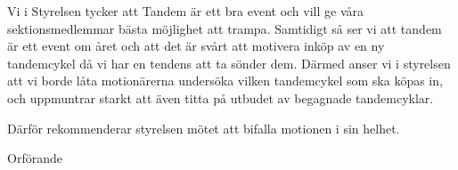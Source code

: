 \documentclass[../_main/handlingar.tex]{subfiles}
\begin{document}
\motionssvar

Vi i Styrelsen tycker att Tandem är ett bra event och vill ge våra sektionsmedlemmar bästa möjlighet att trampa. Samtidigt så ser vi att tandem är ett event om året och att det är svårt att motivera inköp av en ny tandemcykel då vi har en tendens att ta sönder dem. Därmed anser vi i styrelsen att vi borde låta motionärerna undersöka vilken tandemcykel som ska köpas in, och uppmuntrar starkt att även titta på utbudet av begagnade tandemcyklar. 

Därför rekommenderar styrelsen mötet att bifalla motionen i sin helhet.


\begin{signatures}{1}
    \ist
    \signature{\ordf}{Orförande}
\end{signatures}
\end{document}
